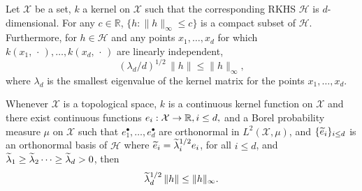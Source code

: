 \documentclass[AHL,Unicode,longabstracts,published]{cedram}
\theoremstyle{remark}
\newcommand{\R}{\mathbb{R}}
\newcommand{\X}{\mathcal{X}}
\newcommand{\cH}{\mathcal{H}}
\let\oldtilde\tilde
\renewcommand*{\tilde}[1]{\mathchoice{\widetilde{#1}}{\widetilde{#1}}{\oldtilde{#1}}{\oldtilde{#1}}}
\renewcommand*{\to}{\mathchoice{\longrightarrow}{\rightarrow}{\rightarrow}{\rightarrow}}
\begin{document}
\begin{lemm}\label{lem:tighter_lbnd}
Let $\X$ be a set, $k$ a kernel on $\X$ such that the corresponding RKHS $\cH$ is $d$-dimensional. For any $c\in \R$, $\{h : \|h\|_\infty \leq c \}$ is a compact subset of $\cH$. Furthermore, for $h \in \cH$ and any points $x_1,\dots,x_d$ for which $k(x_1,\,\cdot\,),\dots, k(x_d,\,\cdot\,)$ are linearly independent,
\[
(\lambda_d/d)^{1/2}\, \|h\| \leq \|h\|_\infty,
\]
where $\lambda_d$ is the smallest eigenvalue of the kernel matrix for the points $x_1,\dots,x_d$.

Whenever $\X$ is a topological space, $k$ is a continuous kernel function on $\X$ and there exist continuous functions $e_i: \X \to \R, i \leq d,$ and a Borel probability measure $\mu$ on $\X$ such that $e_1^\bullet,\dots, e_d^\bullet$ are orthonormal in $L^2(\X,\mu)$, and $\{\tilde e_i\}_{i\leq d}$ is an orthonormal basis of $\cH$ where $\tilde e_i = \tilde \lambda_i^{1/2} e_i$, for all $i \leq d$, and $\tilde \lambda_1 \geq \tilde \lambda_2 \dots \geq \tilde \lambda_d>0$, then
\[
\tilde \lambda_d^{1/2} \, \| h\| \leq \|h\|_\infty.
\]
\end{lemm}
\end{document}

